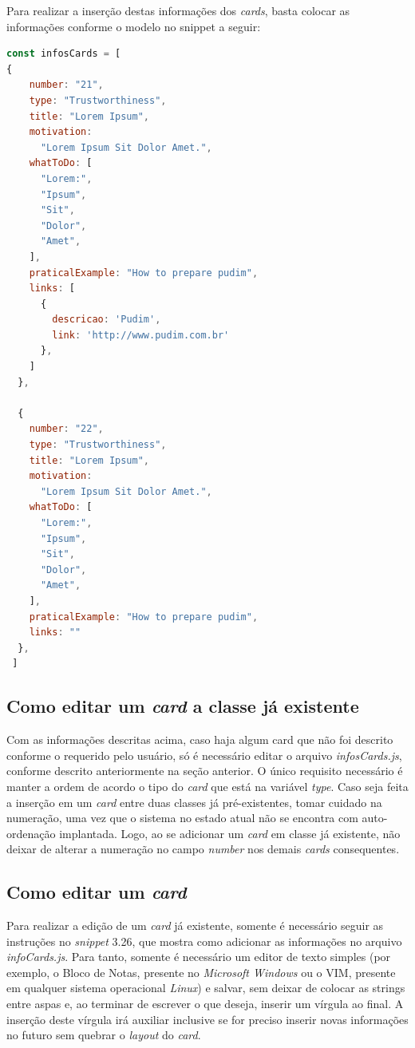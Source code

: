 Para realizar a inserção destas informações dos \textit{cards}, basta colocar as informações conforme o modelo no snippet a seguir:

\begin{lstlisting}[language=JavaScript, caption=Informações novas inseridas nos cards]
const infosCards = [
{
    number: "21",
    type: "Trustworthiness",
    title: "Lorem Ipsum",
    motivation:
      "Lorem Ipsum Sit Dolor Amet.",
    whatToDo: [
      "Lorem:",
      "Ipsum",
      "Sit",
      "Dolor",
      "Amet",
    ],
    praticalExample: "How to prepare pudim",
    links: [
      {
        descricao: 'Pudim',
        link: 'http://www.pudim.com.br'
      },
    ]
  },

  {
    number: "22",
    type: "Trustworthiness",
    title: "Lorem Ipsum",
    motivation:
      "Lorem Ipsum Sit Dolor Amet.",
    whatToDo: [
      "Lorem:",
      "Ipsum",
      "Sit",
      "Dolor",
      "Amet",
    ],
    praticalExample: "How to prepare pudim",
    links: ""
  },
 ]
\end{lstlisting}

\subsection{Como editar um \textit{card} a classe já existente}
Com as informações descritas acima, caso haja algum card que não foi descrito conforme o requerido pelo usuário, só é necessário editar o arquivo \textit{infosCards.js}, conforme descrito anteriormente na seção anterior. O único requisito necessário é manter a ordem de acordo o tipo do \textit{card} que está na variável \textit{type}. Caso seja feita a inserção em um \textit{card} entre  duas classes já pré-existentes, tomar cuidado na numeração, uma vez que o sistema no estado atual não se encontra com auto-ordenação implantada. Logo, ao se adicionar um \textit{card} em classe já existente, não deixar de alterar a numeração no campo \textit{number} nos demais \textit{cards} consequentes.

\subsection{Como editar um \textit{card}}
Para realizar a edição de um \textit{card} já existente, somente é necessário seguir as instruções no \textit{snippet} 3.26, que mostra como adicionar as informações no arquivo \textit{infoCards.js}. Para tanto, somente é necessário um editor de texto simples (por exemplo, o Bloco de Notas, presente no \textit{Microsoft Windows} ou o VIM, presente em qualquer sistema operacional \textit{Linux}) e salvar, sem deixar de colocar as strings entre aspas e, ao terminar de escrever o que deseja, inserir um vírgula ao final. A inserção deste vírgula irá auxiliar inclusive se for preciso inserir novas informações no futuro sem quebrar o \textit{layout} do \textit{card}. 

